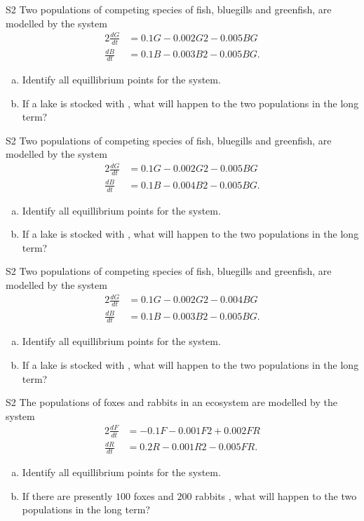 \begin{problem}{S2}
Two populations of competing species of fish, bluegills and greenfish, are modelled by the system
\begin{alignat*}{2}
\frac{dG}{dt} &= 0.1G - 0.002G 2 - 0.005BG \\
\frac{dB}{dt} & = 0.1B - 0.003B 2 - 0.005BG.
\end{alignat*}
\begin{enumerate}[(a)]
\item Identify all equillibrium points for the system.
\item If a lake is stocked with , what will happen to the two populations in the long term?
\end{enumerate}
\end{problem}

\begin{problem}{S2}
Two populations of competing species of fish, bluegills and greenfish, are modelled by the system
\begin{alignat*}{2}
\frac{dG}{dt} &= 0.1G - 0.002G 2 - 0.005BG \\
\frac{dB}{dt} & = 0.1B - 0.004B 2 - 0.005BG.
\end{alignat*}
\begin{enumerate}[(a)]
\item Identify all equillibrium points for the system.
\item If a lake is stocked with , what will happen to the two populations in the long term?
\end{enumerate}
\end{problem}

\begin{problem}{S2}
Two populations of competing species of fish, bluegills and greenfish, are modelled by the system
\begin{alignat*}{2}
\frac{dG}{dt} &= 0.1G - 0.002G 2 - 0.004BG \\
\frac{dB}{dt} & = 0.1B - 0.003B 2 - 0.005BG.
\end{alignat*}
\begin{enumerate}[(a)]
\item Identify all equillibrium points for the system.
\item If a lake is stocked with , what will happen to the two populations in the long term?
\end{enumerate}
\end{problem}

\begin{problem}{S2}
The populations of foxes and rabbits in an ecosystem are modelled by the system
\begin{alignat*}{2}
\frac{dF}{dt} &= -0.1F - 0.001F 2 + 0.002FR \\
\frac{dR}{dt} & = 0.2R − 0.001R 2 - 0.005FR.
\end{alignat*}
\begin{enumerate}[(a)]
\item Identify all equillibrium points for the system.
\item If there are presently \(100\) foxes and \(200\) rabbits , what will happen to the two populations in the long term?
\end{enumerate}
\end{problem}

